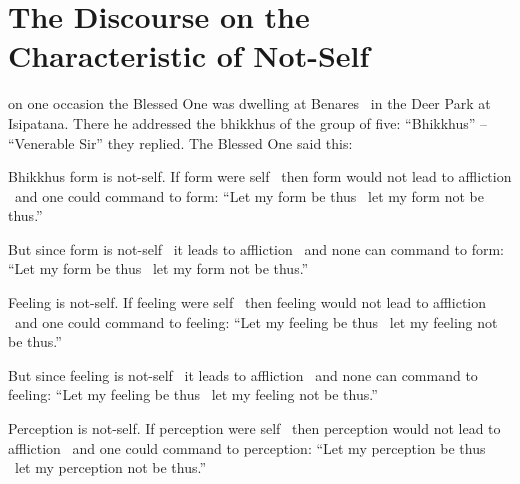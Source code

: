 \section{The Discourse on the Characteristic of Not-Self}
\label{characteristic-of-not-self}

\begin{english-only-hang}
  on one occasion the Blessed One was dwelling at Benares \breathmark\ in the Deer Park at Isipatana. There he addressed the bhikkhus of the group of five: ``Bhikkhus'' – ``Venerable Sir'' they replied. The Blessed One said this:
\end{english-only-hang}

\begin{english-only-hang}
Bhikkhus form is not-self. If form were self \breathmark\ then form would not lead to affliction \breathmark\ and one could command to form: ``Let my form be thus \breathmark\ let my form not be thus.''
\end{english-only-hang}

\begin{english-only-hang}
But since form is not-self \breathmark\ it leads to affliction \breathmark\ and none can command to form: ``Let my form be thus \breathmark\ let my form not be thus.''
\end{english-only-hang}

\begin{english-only-hang}
Feeling is not-self. If feeling were self \breathmark\ then feeling would not lead to affliction \breathmark\ and one could command to feeling: ``Let my feeling be thus \breathmark\ let my feeling not be thus.''
\end{english-only-hang}

\begin{english-only-hang}
But since feeling is not-self \breathmark\ it leads to affliction \breathmark\ and none can command to feeling: ``Let my feeling be thus \breathmark\ let my feeling not be thus.''
\end{english-only-hang}

\begin{english-only-hang}
Perception is not-self. If perception were self \breathmark\ then perception would not lead to affliction \breathmark\ and one could command to perception: ``Let my perception be thus \breathmark\ let my perception not be thus.''
\end{english-only-hang}

